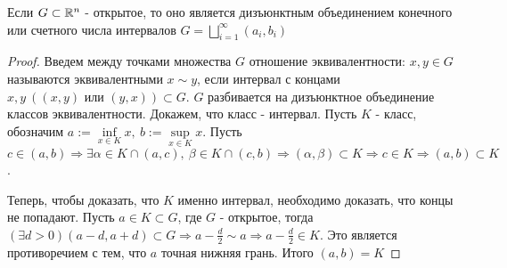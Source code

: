 \newpage
\begin{theorem}
    Если $G \subset \R^n$ - открытое, то оно является дизъюнктным объединением конечного или счетного числа интервалов $G=\bigsqcup\limits_{i=1}^{\infty}(a_i, b_i)$
\end{theorem}
\begin{proof}
Введем между точками множества $G$ отношение эквивалентности: $x, y\in G$ называются эквивалентными $x\sim y$, если интервал с концами $x, y\ ((x, y)\text{ или }(y,x)) \subset G$. $G$ разбивается на дизъюнктное объединение классов эквивалентности. Докажем, что класс - интервал. Пусть $K$ - класс, обозначим ${a:=\inf\limits_{x \in K}x,\ b:=\sup\limits_{x\in K}x}$. Пусть $c \in (a,b) \Rightarrow {\exists \alpha \in K \cap (a, c),\ \beta \in K \cap (c, b) \Rightarrow  (\alpha, \beta)\subset K  \Rightarrow c \in K} \Rightarrow (a,b) \subset K$.

Теперь, чтобы доказать, что $K$ именно интервал, необходимо доказать, что концы не попадают. Пусть $a \in K \subset G$, где $G$ - открытое, тогда $(\exists d >0)(a-d, a+d)\subset G \Rightarrow {a-\frac{d}{2} \sim a} \Rightarrow a-\frac{d}{2} \in K$. Это является противоречием с тем, что $a$ точная нижняя грань. Итого $(a, b)=K$
\end{proof}


